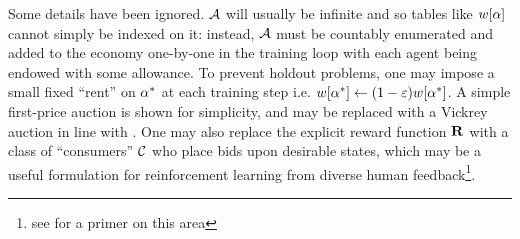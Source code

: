 Some details have been ignored. $\mathcal{A}$ will usually be infinite and so tables like $w[\alpha]$ cannot simply be indexed on it: instead, $\mathcal{A}$ must be countably enumerated and added to the economy one-by-one in the training loop with each agent being endowed with some allowance. To prevent holdout problems, one may impose a small fixed ``rent'' on $\alpha^*$ at each training step i.e. $w[\alpha^*]\gets(1-\varepsilon)w[\alpha^*]$. A simple first-price auction is shown for simplicity, and may be replaced with a Vickrey auction in line with \cite{changDecentralizedReinforcementLearning2020}. One may also replace the explicit reward function $\mathbf{R}$ with a class of ``consumers'' $\mathcal{C}$ who place bids upon desirable states, which may be a useful formulation for reinforcement learning from diverse human feedback\footnote{see \cite{conitzerPositionSocialChoice2024, geAxiomsAIAlignment2024a} for a primer on this area}.


